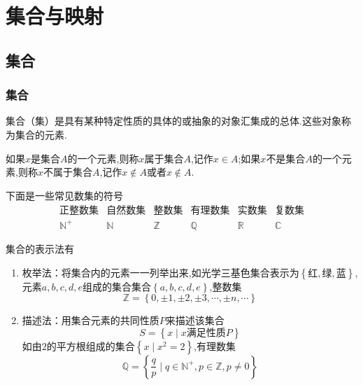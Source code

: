 \newpage
\chapter{集合与映射}
\setcounter{section}{0}
\section{集合}
\subsection{集合}
\begin{formal}
\begin{definition}[集合的定义]\label{def:集合的定义}
    集合（集）是具有某种特定性质的具体的或抽象的对象汇集成的总体.这些对象称为集合的元素.
\end{definition}
\end{formal}
\begin{formal}
\begin{definition}[元素与集合的关系]\label{def:元素与集合的关系}
    如果$x$是集合$A$的一个元素,则称$x$属于集合$A$,记作$x\in A$;如果$x$不是集合$A$的一个元素,则称$x$不属于集合$A$,记作$x\notin A$或者$x\nin A$.
\end{definition}
\end{formal}
\begin{brown}
\begin{example}下面是一些常见数集的符号\[
\begin{matrix}
    \text{正整数集}&\text{自然数集}&\text{整数集}&\text{有理数集}&\text{实数集}&\text{复数集}\\
    \mathbb{N}^+&\mathbb{N}&\mathbb{Z}&\mathbb{Q}&\mathbb{R}&\mathbb{C}
\end{matrix}\]
\end{example}
\end{brown}
\begin{formal}
\begin{proposition}[集合的表示方法]\label{prop:集合的表示方法}
    集合的表示法有\begin{enumerate}[label={\textup{(\arabic*)}}]
        \item 枚举法：将集合内的元素一一列举出来,如光学三基色集合表示为$\left\{
            \text{红},\text{绿},\text{蓝}
        \right\}$,元素$a,b,c,d,e$组成的集合集合$\left\{
            a,b,c,d,e
        \right\}$,整数集\[
        \mathbb{Z}=\left\{
            0,\pm 1,\pm 2,\pm 3,\cdots,\pm n,\cdots
        \right\}
        \]
        \item 描述法：用集合元素的共同性质$P$来描述该集合\[
        S=\left\{
            x\mid x\text{满足性质}P
        \right\}
        \]如由$2$的平方根组成的集合$\left\{
            x\mid x^2=2
        \right\}$,有理数集\[
        \mathbb{Q}= \left\{
            \frac{q}{p}\mid q\in \mathbb{N}^+,p\in \mathbb{Z},p\neq 0
        \right\}
        \]
    \end{enumerate}
\end{proposition}
\end{formal}
